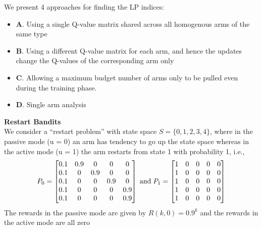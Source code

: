 \documentclass{slides}
\begin{document}
{{\newpage
We present 4 approaches for finding the LP indices:
\begin{itemize}
    \vspace{-15mm}
    \item \textbf{A}. Using a single Q-value matrix shared across all homogenous arms of the same type
    \vspace{-15mm}
    \item \textbf{B}. Using a different Q-value matrix for each arm, and hence the updates change the Q-values of the corresponding arm only
    \vspace{-15mm}
    \item \textbf{C}. Allowing a maximum budget number of arms only to be pulled even during the training phase. 
    \vspace{-15mm}
    \item \textbf{D}. Single arm analysis
\end{itemize}
\newpage
\textbf{Restart Bandits}\\
We consider a “restart problem” with state space $S = \{0, 1, 2, 3, 4\}$, where in the passive mode (u = 0) an arm has tendency to go up the state space whereas in the active mode (u = 1) the arm restarts from state
1 with probability 1, i.e.,
\begin{align*}
P_0=
\begin{bmatrix}
0.1 & 0.9 & 0&0&0\\
0.1 & 0 & 0.9 & 0 &0\\
0.1&0&0&0.9&0\\
0.1&0&0&0&0.9\\
0.1&0&0&0&0.9
\end{bmatrix}
\hspace{1mm} \text{and} \hspace{1mm}
P_1=
\begin{bmatrix}
1 & 0 & 0&0&0\\
1 & 0 & 0 & 0 &0\\
1&0&0&0&0\\
1&0&0&0&0\\
1&0&0&0&0
\end{bmatrix}
\end{align*}
The rewards in the passive mode are given by $R(k,0) = 0.9^k$ and
the rewards in the active mode are all zero
\newpage

}}
\end{document}
